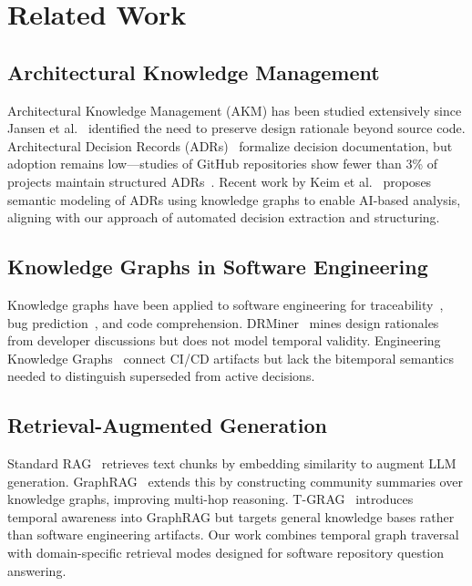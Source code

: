 \documentclass[conference]{IEEEtran}
\begin{document}
\section{Related Work}
\label{sec:related}

\subsection{Architectural Knowledge Management}
Architectural Knowledge Management (AKM) has been studied extensively since Jansen et al.~\cite{jansen2005software} identified the need to preserve design rationale beyond source code. Architectural Decision Records (ADRs)~\cite{tyree2005architecture} formalize decision documentation, but adoption remains low---studies of GitHub repositories show fewer than 3\% of projects maintain structured ADRs~\cite{bi2024mining}. Recent work by Keim et al.~\cite{keim2024semantic} proposes semantic modeling of ADRs using knowledge graphs to enable AI-based analysis, aligning with our approach of automated decision extraction and structuring.

\subsection{Knowledge Graphs in Software Engineering}
Knowledge graphs have been applied to software engineering for traceability~\cite{maalej2024leveraging}, bug prediction~\cite{wang2024comprehensive}, and code comprehension. DRMiner~\cite{drminer2024} mines design rationales from developer discussions but does not model temporal validity. Engineering Knowledge Graphs~\cite{harness2024ekg} connect CI/CD artifacts but lack the bitemporal semantics needed to distinguish superseded from active decisions.

\subsection{Retrieval-Augmented Generation}
Standard RAG~\cite{lewis2020retrieval} retrieves text chunks by embedding similarity to augment LLM generation. GraphRAG~\cite{edge2024local} extends this by constructing community summaries over knowledge graphs, improving multi-hop reasoning. T-GRAG~\cite{tgrag2025} introduces temporal awareness into GraphRAG but targets general knowledge bases rather than software engineering artifacts. Our work combines temporal graph traversal with domain-specific retrieval modes designed for software repository question answering.
\end{document}
